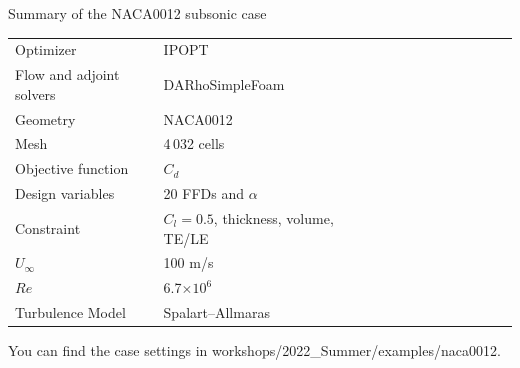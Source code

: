 \documentclass{bredelebeamer}
\begin{document}
\begin{frame}{Summary of the NACA0012 subsonic case}

  \begin{table}
    \renewcommand{\arraystretch}{1.5}
    \small
    \centering
    \label{tab:implemented_models}
    \begin{tabular}{llllllllllll}
    \hline
    Optimizer   & IPOPT \\
    Flow and adjoint solvers  & DARhoSimpleFoam  \\
    Geometry  & NACA0012 \\
    Mesh  & 4\,032 cells\\
    Objective function  & $C_d$ \\
    Design variables & 20 FFDs and $\alpha$ \\
    Constraint & $C_l=0.5$, thickness, volume, TE/LE \\
    $U_\infty$  & 100 m/s \\
    $Re$  & 6.7$\times10^6$\\
    Turbulence Model  & Spalart--Allmaras\\
     \hline
    \end{tabular}
  \end{table}

  You can find the case settings in workshops/2022\_Summer/examples/naca0012.
\end{frame}
\end{document}
